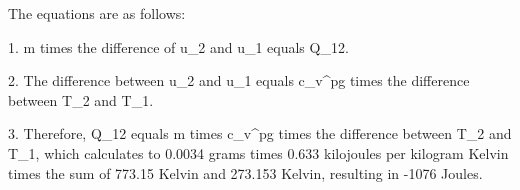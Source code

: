 The equations are as follows:

1. m times the difference of u_2 and u_1 equals Q_12.

2. The difference between u_2 and u_1 equals c_v^pg times the difference between T_2 and T_1.

3. Therefore, Q_12 equals m times c_v^pg times the difference between T_2 and T_1, which calculates to 0.0034 grams times 0.633 kilojoules per kilogram Kelvin times the sum of 773.15 Kelvin and 273.153 Kelvin, resulting in -1076 Joules.